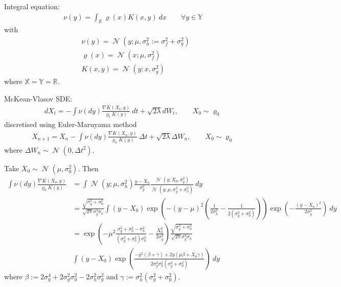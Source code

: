 \documentclass[a4paper]{amsart}
\newcommand{\X}{\ensuremath{\mathbb{X}}\xspace}
\newcommand{\Y}{\ensuremath{\mathbb{Y}}\xspace}
\def\real{\mathbb{R}}
\DeclareMathOperator{\N}{\mathcal{N}}
\begin{document}
Integral equation:
\begin{align*}
\nu(y) = \int_{\X} \varrho(x)K(x, y)\ dx \qquad \forall y\in \Y
\end{align*}
with
\begin{align*}
& \nu(y) = \N(y; \mu, \sigma_h^2:= \sigma_f^2 + \sigma_g^2)\\
& \varrho(x) = \N(x; \mu, \sigma_f^2)\\
& K(x, y) = \N(y; x, \sigma_g^2)
\end{align*}
where $\X = \Y = \real$.

McKean-Vlasov SDE:
\begin{align*}
dX_t = -\int \nu(dy)\frac{\nabla K(X_t, y)}{\varrho_tK(y)}\ dt + \sqrt{2\lambda}dW_t,\qquad X_0\sim \varrho_0 
\end{align*}
discretised using Euler-Maruyama method
\begin{align*}
X_{n+1} = X_n -\int \nu(dy)\frac{\nabla K(X_n, y)}{\varrho_n K(y)}\ \Delta t + \sqrt{2\lambda}\Delta W_n,\qquad X_0\sim \varrho_0 
\end{align*}
where $\Delta W_n \sim \N(0, \Delta t^2)$.

Take $X_0\sim \N(\mu, \sigma_0^2)$. Then
\begin{align*}
\int \nu(dy)\frac{\nabla K(X_0, y)}{\varrho_0 K(y)} &= \int \N(y; \mu, \sigma_h^2)\frac{y - X_0}{\sigma_g^2}\frac{\N(y; X_0, \sigma_g^2)}{\N(y; \mu, \sigma_g^2 + \sigma_0^2)}\ dy\\
&= \frac{\sqrt{\sigma_g^2 + \sigma_0^2}}{\sqrt{2\pi}\sigma_g^3\sigma_h}\int (y - X_0)\exp\left( -(y - \mu)^2\left(\frac{1}{2\sigma_h^2} - \frac{1}{2(\sigma_g^2 + \sigma_0^2)} \right)\right)\exp\left( -\frac{(y - X_0)^2}{2\sigma_g^2}\right)\ dy\\
&= \exp\left( -\mu^2\frac{\sigma_g^2 + \sigma_0^2 - \sigma_h^2}{(\sigma_g^2 + \sigma_0^2)\sigma_h^2} - \frac{X_0^2}{2\sigma_g^2}\right)\frac{\sqrt{\sigma_g^2 + \sigma_0^2}}{\sqrt{2\pi}\sigma_g^3\sigma_h}\\
&\int (y - X_0)\exp\left( \frac{-y^2(\beta + \gamma)+2y(\mu \beta + X_0\gamma)}{2\sigma_g^2\sigma_h^2(\sigma_g^2 + \sigma_0^2)}\right)\ dy
\end{align*}
where $\beta := 2\sigma_g^4 + 2\sigma_g^2\sigma_0^2 - 2\sigma_h^2\sigma_g^2$ and $\gamma := \sigma_h^2(\sigma_g^2 + \sigma_0^2)$.
\end{document}

